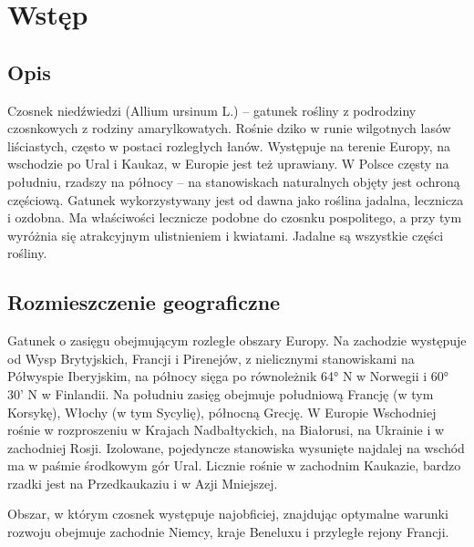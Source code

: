 
\chapter{Wstęp} %

\label{Chapter1} %


\section{Opis}

Czosnek niedźwiedzi (Allium ursinum L.) – gatunek rośliny z podrodziny czosnkowych z rodziny amarylkowatych. Rośnie dziko w runie wilgotnych lasów liściastych, często w postaci rozległych łanów. Występuje na terenie Europy, na wschodzie po Ural i Kaukaz, w Europie jest też uprawiany. W Polsce częsty na południu, rzadszy na północy – na stanowiskach naturalnych objęty jest ochroną częściową. Gatunek wykorzystywany jest od dawna jako roślina jadalna, lecznicza i ozdobna. Ma właściwości lecznicze podobne do czosnku pospolitego, a przy tym wyróżnia się atrakcyjnym ulistnieniem i kwiatami. Jadalne są wszystkie części rośliny.

\section{Rozmieszczenie geograficzne}

Gatunek o zasięgu obejmującym rozległe obszary Europy. Na zachodzie występuje od Wysp Brytyjskich, Francji i Pirenejów, z nielicznymi stanowiskami na Półwyspie Iberyjskim, na północy sięga po równoleżnik 64° N w Norwegii i 60° 30' N w Finlandii. Na południu zasięg obejmuje południową Francję (w tym Korsykę), Włochy (w tym Sycylię), północną Grecję. W Europie Wschodniej rośnie w rozproszeniu w Krajach Nadbałtyckich, na Białorusi, na Ukrainie i w zachodniej Rosji. Izolowane, pojedyncze stanowiska wysunięte najdalej na wschód ma w paśmie środkowym gór Ural. Licznie rośnie w zachodnim Kaukazie, bardzo rzadki jest na Przedkaukaziu i w Azji Mniejszej.

Obszar, w którym czosnek występuje najobficiej, znajdując optymalne warunki rozwoju obejmuje zachodnie Niemcy, kraje Beneluxu i przyległe rejony Francji.

